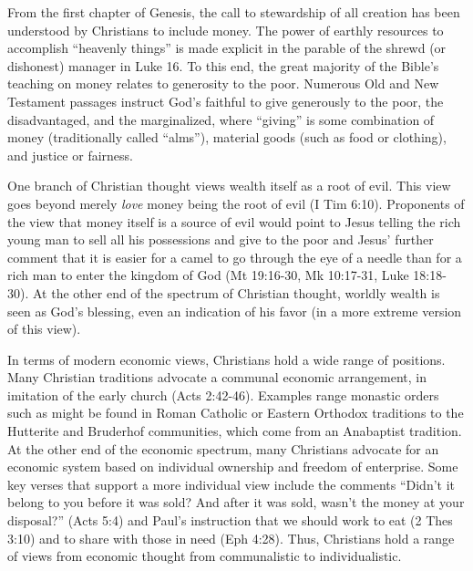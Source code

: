 \documentclass[12pt]{article}
\begin{document}
From the first chapter of Genesis, the call to stewardship of all creation has
been understood by Christians to include money. The power of earthly resources to accomplish ``heavenly things'' is made
explicit in the parable of the shrewd (or dishonest) manager in Luke 16. To this end, the great majority of the Bible's
teaching on money relates to generosity to the poor. Numerous Old and New Testament passages instruct God's faithful to
give generously to the poor, the disadvantaged, and the marginalized, where ``giving'' is some combination of money
(traditionally called ``alms''), material goods (such as food or clothing), and justice or fairness.

One branch of Christian thought views wealth itself as a root of evil. This view goes beyond merely \emph{love} money
being the root of evil (I Tim 6:10). Proponents of the view that money itself is a source of evil would point to Jesus
telling the rich young man to sell all his possessions and give to the poor and Jesus' further comment that it is easier
for a camel to go through the eye of a needle than for a rich man to enter the kingdom of God (Mt 19:16-30, Mk 10:17-31,
Luke 18:18-30). At the other end of the spectrum of Christian thought, worldly wealth is seen as God's blessing, even an
indication of his favor (in a more extreme version of this view).

In terms of modern economic views, Christians hold a wide range of positions. Many Christian traditions advocate a
communal economic arrangement, in imitation of the early church (Acts 2:42-46). Examples range monastic orders such as
might be found in Roman Catholic or Eastern Orthodox traditions to the Hutterite and Bruderhof communities, which come
from an Anabaptist tradition. At the other end of the economic spectrum, many Christians advocate for an economic system
based on individual ownership and freedom of enterprise. Some key verses that support a more individual view include the
comments ``Didn’t it belong to you before it was sold? And after it was sold, wasn’t the money at your disposal?'' (Acts
5:4) and Paul's instruction that we should work to eat (2 Thes 3:10) and to share with those in need (Eph 4:28).
Thus, Christians hold a range of views from economic thought from communalistic to individualistic.
\end{document}
